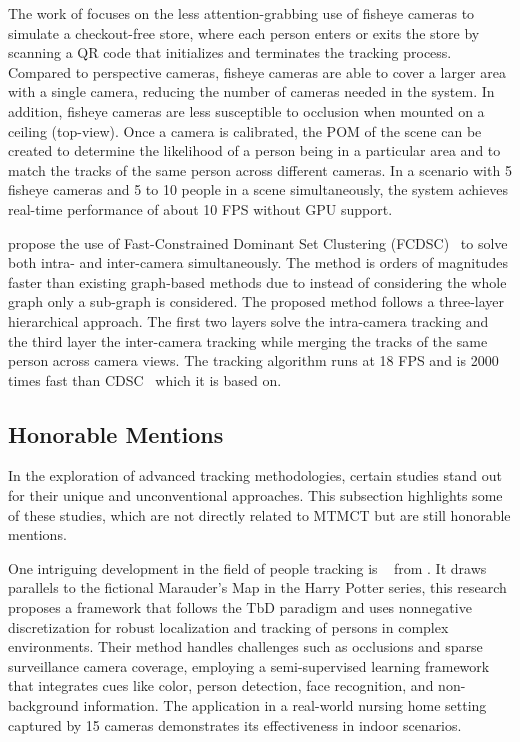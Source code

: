 The work of \textcite{Wang21} focuses on the less attention-grabbing use of fisheye cameras to simulate a checkout-free store, where each person enters or exits the store by scanning a QR code that initializes and terminates the tracking process. Compared to perspective cameras, fisheye cameras are able to cover a larger area with a single camera, reducing the number of cameras needed in the system. In addition, fisheye cameras are less susceptible to occlusion when mounted on a ceiling (top-view). Once a camera is calibrated, the POM of the scene can be created to determine the likelihood of a person being in a particular area and to match the tracks of the same person across different cameras. In a scenario with 5 fisheye cameras and 5 to 10 people in a scene simultaneously, the system achieves real-time performance of about 10 FPS without GPU support.

\citeauthor{Tesfaye19} propose the use of Fast-Constrained Dominant Set Clustering (FCDSC)~\cite{Tesfaye19} to solve both intra- and inter-camera simultaneously. The method is orders of magnitudes faster than existing graph-based methods due to instead of considering the whole graph only a sub-graph is considered. The proposed method follows a three-layer hierarchical approach. The first two layers solve the intra-camera tracking and the third layer the inter-camera tracking while merging the tracks of the same person across camera views. The tracking algorithm runs at 18 FPS and is 2000 times fast than CDSC~\cite{Zemene16} which it is based on.

\subsection{Honorable Mentions}\label{subsec:honorable_mentions}
In the exploration of advanced tracking methodologies, certain studies stand out for their unique and unconventional approaches. This subsection highlights some of these studies, which are not directly related to MTMCT but are still honorable mentions.

One intriguing development in the field of people tracking is ~\cite{Yu13} from \citeyear{Yu13}. It draws parallels to the fictional Marauder's Map in the Harry Potter series, this research proposes a framework that follows the TbD paradigm and uses nonnegative discretization for robust localization and tracking of persons in complex environments. Their method handles challenges such as occlusions and sparse surveillance camera coverage, employing a semi-supervised learning framework that integrates cues like color, person detection, face recognition, and non-background information. The application in a real-world nursing home setting captured by 15 cameras demonstrates its effectiveness in indoor scenarios.

